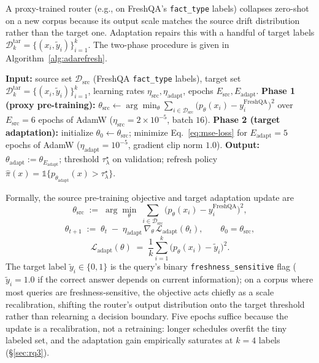 \documentclass[pdflatex,sn-basic]{sn-jnl}
\begin{document}
A proxy-trained router (e.g., on FreshQA's \texttt{fact\_type} labels) collapses zero-shot on a new corpus because its output scale matches the source drift distribution rather than the target one. Adaptation repairs this with a handful of target labels $\mathcal{D}^{\mathrm{tar}}_k = \{(x_i, \tilde y_i)\}_{i=1}^{k}$. The two-phase procedure is given in Algorithm~\ref{alg:adarefresh}.

\begin{algorithm}[htbp]
\caption{AdaRefresh: proxy-train on source, adapt on $k$ target labels.}
\label{alg:adarefresh}
\begin{algorithmic}[1]
\State \textbf{Input:} source set $\mathcal{D}_{\mathrm{src}}$ (FreshQA \texttt{fact\_type} labels), target set $\mathcal{D}^{\mathrm{tar}}_k = \{(x_i, \tilde y_i)\}_{i=1}^{k}$, learning rates $\eta_{\mathrm{src}}, \eta_{\mathrm{adapt}}$, epochs $E_{\mathrm{src}}, E_{\mathrm{adapt}}$.
\State \textbf{Phase 1 (proxy pre-training):} $\theta_{\mathrm{src}} \gets \arg\min_\theta \sum_{i \in \mathcal{D}_{\mathrm{src}}} \big(p_\theta(x_i) - y_i^{\mathrm{FreshQA}}\big)^2$ over $E_{\mathrm{src}}{=}6$ epochs of AdamW ($\eta_{\mathrm{src}}{=}2{\times}10^{-5}$, batch $16$).
\State \textbf{Phase 2 (target adaptation):} initialize $\theta_0 \gets \theta_{\mathrm{src}}$; minimize Eq.~\eqref{eq:mse-loss} for $E_{\mathrm{adapt}}{=}5$ epochs of AdamW ($\eta_{\mathrm{adapt}}{=}10^{-5}$, gradient clip norm $1.0$).
\State \textbf{Output:} $\theta_{\mathrm{adapt}} := \theta_{E_{\mathrm{adapt}}}$; threshold $\tau^\star_\lambda$ on validation; refresh policy $\hat\pi(x) = \mathbb{1}\{p_{\theta_{\mathrm{adapt}}}(x) > \tau^\star_\lambda\}$.
\end{algorithmic}
\end{algorithm}

\noindent Formally, the source pre-training objective and target adaptation update are
\begin{equation}
\label{eq:src-pretrain}
\theta_{\mathrm{src}} \;:=\; \arg\min_{\theta}\;\sum_{i \in \mathcal{D}_{\mathrm{src}}}\big(p_{\theta}(x_i) - y_i^{\mathrm{FreshQA}}\big)^{2},
\end{equation}
\begin{equation}
\label{eq:adapt-update}
\theta_{t+1} \;:=\; \theta_t \;-\; \eta_{\mathrm{adapt}}\,\nabla_{\theta}\,\mathcal{L}_{\mathrm{adapt}}(\theta_t), \qquad \theta_0 = \theta_{\mathrm{src}},
\end{equation}
\begin{equation}
\label{eq:mse-loss}
\mathcal{L}_{\mathrm{adapt}}(\theta) \;=\; \frac{1}{k}\sum_{i=1}^{k}\big(p_{\theta}(x_i)-\tilde y_i\big)^{2}.
\end{equation}
The target label $\tilde y_i \in \{0,1\}$ is the query's binary \texttt{freshness\_sensitive} flag ($\tilde y_i = 1.0$ if the correct answer depends on current information); on a corpus where most queries are freshness-sensitive, the objective acts chiefly as a scale recalibration, shifting the router's output distribution onto the target threshold rather than relearning a decision boundary. Five epochs suffice because the update is a recalibration, not a retraining: longer schedules overfit the tiny labeled set, and the adaptation gain empirically saturates at $k{=}4$ labels (§\ref{sec:rq3}).
\end{document}
